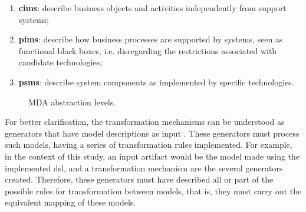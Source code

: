 \begin{enumerate}
     \item \textbf{\acp{cim}}: describe business objects and activities independently from support systems;
     \item \textbf{\acp{pim}}: describe how business processes are supported by systems, seen as functional black boxes, i.e. disregarding the restrictions associated with candidate technologies;
     \item \textbf{\acp{psm}}: describe system components as implemented by specific technologies.
\end{enumerate}

\begin{figure}[!htb]
    \centering
    \caption{MDA abstraction levels.}
    
    \label{fig:MDA}
\end{figure}

For better clarification, the transformation mechanisms can be understood as generators that have model descriptions as input \cite{Hutchinson:2011}.
These generators must process such models, having a series of transformation rules implemented.
For example, in the context of this study, an input artifact would be the model made using the implemented \ac{dsl}, and a transformation mechanism are the several generators created.
Therefore, these generators must have described all or part of the possible rules for transformation between models, that is, they must carry out the equivalent mapping of these models.

